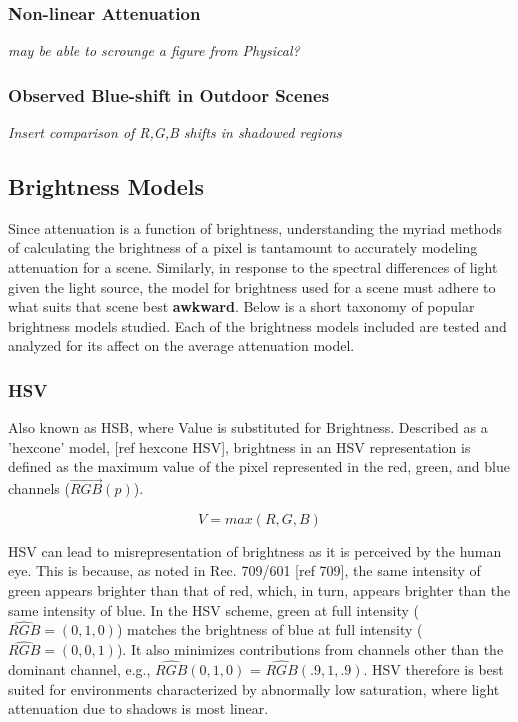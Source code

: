 \documentclass[12pt]{report}
\begin{document}
\subsubsection{Non-linear Attenuation}

\textit{may be able to scrounge a figure from Physical?}

\subsubsection{Observed Blue-shift in Outdoor Scenes}

\textit{Insert comparison of R,G,B shifts in shadowed regions}

\subsection{Brightness Models}

Since attenuation is a function of brightness, understanding the myriad methods of calculating the brightness of a pixel is tantamount to accurately modeling attenuation for a scene. Similarly, in response to the spectral differences of light given the light source, the model for brightness used for a scene must adhere to what suits that scene best \textbf{awkward}. Below is a short taxonomy of popular brightness models studied. Each of the brightness models included are tested and analyzed for its affect on the average attenuation model.

\subsubsection{HSV}

Also known as HSB, where Value is substituted for Brightness. Described as a 'hexcone' model, [ref hexcone HSV], brightness in an HSV representation is defined as the maximum value of the pixel represented in the red, green, and blue channels ($\vec{RGB}(p)$).

\begin{equation}
V = max(R, G, B)
\end{equation}

HSV can lead to misrepresentation of brightness as it is perceived by the human eye. This is because, as noted in Rec. 709/601 [ref 709], the same intensity of green appears brighter than that of red, which, in turn, appears brighter than the same intensity of blue. In the HSV scheme, green at full intensity ($\hat{RGB} = (0, 1, 0)$) matches the brightness of blue at full intensity ($\hat{RGB} = (0, 0, 1)$). It also minimizes contributions from channels other than the dominant channel, e.g., $\hat{RGB}(0, 1, 0)$ = $\hat{RGB}(.9, 1, .9)$. HSV therefore is best suited for environments characterized by abnormally low saturation, where light attenuation due to shadows is most linear.
\end{document}
